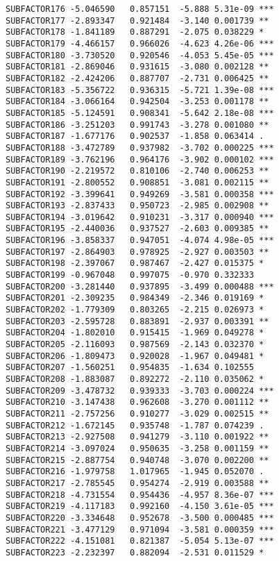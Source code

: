 \documentclass[]{book}
\begin{document}
\begin{verbatim}
SUBFACTOR176 -5.046590   0.857151  -5.888 5.31e-09 ***
SUBFACTOR177 -2.893347   0.921484  -3.140 0.001739 ** 
SUBFACTOR178 -1.841189   0.887291  -2.075 0.038229 *  
SUBFACTOR179 -4.466157   0.966026  -4.623 4.26e-06 ***
SUBFACTOR180 -3.730520   0.920546  -4.053 5.45e-05 ***
SUBFACTOR181 -2.869046   0.931615  -3.080 0.002128 ** 
SUBFACTOR182 -2.424206   0.887707  -2.731 0.006425 ** 
SUBFACTOR183 -5.356722   0.936315  -5.721 1.39e-08 ***
SUBFACTOR184 -3.066164   0.942504  -3.253 0.001178 ** 
SUBFACTOR185 -5.124591   0.908341  -5.642 2.18e-08 ***
SUBFACTOR186 -3.251203   0.991743  -3.278 0.001080 ** 
SUBFACTOR187 -1.677176   0.902537  -1.858 0.063414 .  
SUBFACTOR188 -3.472789   0.937982  -3.702 0.000225 ***
SUBFACTOR189 -3.762196   0.964176  -3.902 0.000102 ***
SUBFACTOR190 -2.219572   0.810106  -2.740 0.006253 ** 
SUBFACTOR191 -2.800552   0.908851  -3.081 0.002115 ** 
SUBFACTOR192 -3.399641   0.949269  -3.581 0.000358 ***
SUBFACTOR193 -2.837433   0.950723  -2.985 0.002908 ** 
SUBFACTOR194 -3.019642   0.910231  -3.317 0.000940 ***
SUBFACTOR195 -2.440036   0.937527  -2.603 0.009385 ** 
SUBFACTOR196 -3.858337   0.947051  -4.074 4.98e-05 ***
SUBFACTOR197 -2.864903   0.978925  -2.927 0.003503 ** 
SUBFACTOR198 -2.397067   0.987467  -2.427 0.015375 *  
SUBFACTOR199 -0.967048   0.997075  -0.970 0.332333    
SUBFACTOR200 -3.281440   0.937895  -3.499 0.000488 ***
SUBFACTOR201 -2.309235   0.984349  -2.346 0.019169 *  
SUBFACTOR202 -1.779309   0.803265  -2.215 0.026973 *  
SUBFACTOR203 -2.595728   0.883891  -2.937 0.003391 ** 
SUBFACTOR204 -1.802010   0.915415  -1.969 0.049278 *  
SUBFACTOR205 -2.116093   0.987569  -2.143 0.032370 *  
SUBFACTOR206 -1.809473   0.920028  -1.967 0.049481 *  
SUBFACTOR207 -1.560251   0.954835  -1.634 0.102555    
SUBFACTOR208 -1.883087   0.892272  -2.110 0.035062 *  
SUBFACTOR209 -3.478732   0.939333  -3.703 0.000224 ***
SUBFACTOR210 -3.147438   0.962608  -3.270 0.001112 ** 
SUBFACTOR211 -2.757256   0.910277  -3.029 0.002515 ** 
SUBFACTOR212 -1.672145   0.935748  -1.787 0.074239 .  
SUBFACTOR213 -2.927508   0.941279  -3.110 0.001922 ** 
SUBFACTOR214 -3.097024   0.950635  -3.258 0.001159 ** 
SUBFACTOR215 -2.887754   0.940748  -3.070 0.002200 ** 
SUBFACTOR216 -1.979758   1.017965  -1.945 0.052070 .  
SUBFACTOR217 -2.785545   0.954274  -2.919 0.003588 ** 
SUBFACTOR218 -4.731554   0.954436  -4.957 8.36e-07 ***
SUBFACTOR219 -4.117183   0.992160  -4.150 3.61e-05 ***
SUBFACTOR220 -3.334648   0.952678  -3.500 0.000485 ***
SUBFACTOR221 -3.477129   0.971094  -3.581 0.000359 ***
SUBFACTOR222 -4.151081   0.821387  -5.054 5.13e-07 ***
SUBFACTOR223 -2.232397   0.882094  -2.531 0.011529 *  

\end{verbatim}
\end{document}
